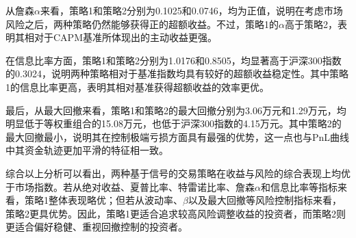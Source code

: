 \documentclass[a4paper,12pt]{article}
\begin{document}
从詹森$\alpha$来看，策略1和策略2分别为0.1025和0.0746，均为正值，说明在考虑市场风险之后，两种策略仍然能够获得正的超额收益。不过，策略1的$\alpha$高于策略2，表明其相对于CAPM基准所体现出的主动收益更强。

在信息比率方面，策略1和策略2分别为1.0176和0.8505，均显著高于沪深300指数的0.3024，说明两种策略相对于基准指数均具有较好的超额收益稳定性。其中策略1的信息比率更高，表明其相对基准获得超额收益的效率更优。

最后，从最大回撤来看，策略1和策略2的最大回撤分别为3.06万元和1.29万元，均明显低于等权重组合的15.08万元，也低于沪深300指数的4.15万元。其中策略2的最大回撤最小，说明其在控制极端亏损方面具有最强的优势，这一点也与PnL曲线中其资金轨迹更加平滑的特征相一致。

综合以上分析可以看出，两种基于信号的交易策略在收益与风险的综合表现上均优于市场指数。若从绝对收益、夏普比率、特雷诺比率、詹森$\alpha$和信息比率等指标来看，策略1整体表现略优；但若从波动率、$\beta$以及最大回撤等风险控制指标来看，策略2更具优势。因此，策略1更适合追求较高风险调整收益的投资者，而策略2则更适合偏好稳健、重视回撤控制的投资者。
\end{document}
